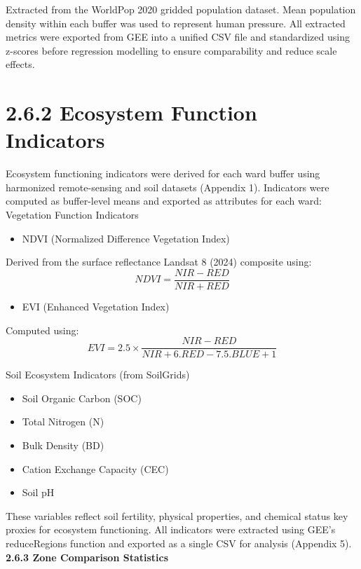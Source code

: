 Extracted from the WorldPop 2020 gridded population dataset. Mean population density within each buffer was used to represent human pressure.
All extracted metrics were exported from GEE into a unified CSV file and standardized using z-scores before regression modelling to ensure comparability and reduce scale effects.
\hypertarget{ecosystem-function-indicators}{%
\section{\texorpdfstring{\textbf{2.6.2 Ecosystem Function Indicators}}{2.6.2 Ecosystem Function Indicators}}\label{ecosystem-function-indicators}}

Ecosystem functioning indicators were derived for each ward buffer using harmonized remote-sensing and soil datasets (Appendix 1). Indicators were computed as buffer-level means and exported as attributes for each ward:
Vegetation Function Indicators

\begin{itemize}
\item
NDVI (Normalized Difference Vegetation Index)
\end{itemize}


Derived from the surface reflectance Landsat 8 (2024) composite using:
\[NDVI = \frac{NIR - RED}{NIR + RED}\]


\begin{itemize}
\item
EVI (Enhanced Vegetation Index)
\end{itemize}


Computed using:
\[EVI = 2.5 \times \frac{NIR - RED}{NIR + 6.RED - 7.5.BLUE + 1}\]


Soil Ecosystem Indicators (from SoilGrids)

\begin{itemize}
\item
  Soil Organic Carbon (SOC)
\item
  Total Nitrogen (N)
\item
  Bulk Density (BD)
\item
  Cation Exchange Capacity (CEC)
\item
  Soil pH
\end{itemize}

These variables reflect soil fertility, physical properties, and chemical status key proxies for ecosystem functioning. All indicators were extracted using GEE's reduceRegions function and exported as a single CSV for analysis (Appendix 5).
{}\textbf{2.6.3 Zone Comparison Statistics}

